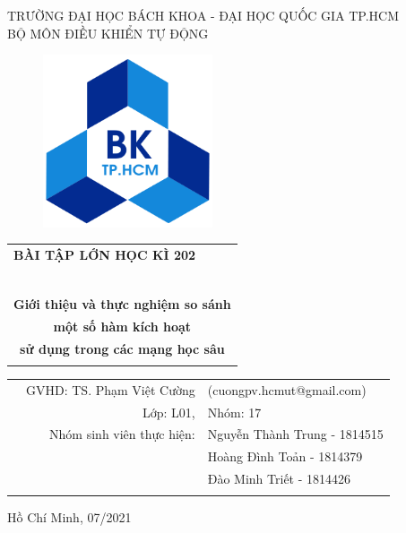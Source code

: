 \documentclass[a4paper, 12pt]{report}
\begin{document}
\begin{titlepage}

\begin{center}
TRƯỜNG ĐẠI HỌC BÁCH KHOA - ĐẠI HỌC QUỐC GIA TP.HCM\\
BỘ MÔN ĐIỀU KHIỂN TỰ ĐỘNG
\end{center}

\vspace{1cm}

\begin{figure}[!h]
\begin{center}
\includegraphics[width=5cm]{hcmut.png}
\end{center}
\end{figure}

\vspace{1cm}


\begin{center}
\begin{tabular}{c}
\multicolumn{1}{l}{\textbf{{\Large BÀI TẬP LỚN HỌC KÌ 202}}}\\
~~\\
\hline
\\
\textbf{\Huge Giới thiệu và thực nghiệm so sánh}\\
\textbf{\Huge một số hàm kích hoạt}\\
\textbf{\Huge sử dụng trong các mạng học sâu}\\
\\
\hline
\end{tabular}
\end{center}

\vspace{1cm}

\begin{table}[h]
\begin{tabular}{rrl}

\hspace{2cm} & GVHD: TS. Phạm Việt Cường & (cuongpv.hcmut@gmail.com)\\
& Lớp: L01, & Nhóm: 17\\
& Nhóm sinh viên thực hiện: & Nguyễn Thành Trung - 1814515\\
& & Hoàng Đình Toản - 1814379\\
& & Đào Minh Triết - 1814426\\
\vspace{30pt}\\

\end{tabular}
\end{table}

\begin{center}
{\footnotesize Hồ Chí Minh, 07/2021}
\end{center}
\end{titlepage}
\end{document}
